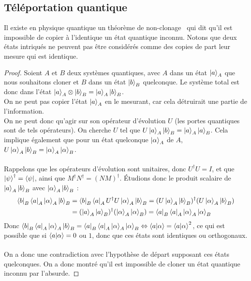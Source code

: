 \subsection{Téléportation quantique}\label{subsec:quantum-teleportation}

Il existe en physique quantique un théorème de non-clonage~\cite{wiki:non-cloning} qui dit qu'il est
impossible de copier à l'identique un état quantique inconnu.
Notons que deux états intriqués ne peuvent pas être considérés comme des copies
de part leur mesure qui est identique.
\begin{proof}
    Soient $A$ et $B$ deux systèmes quantiques, avec $A$ dans un état
    $\ket{a}_A$ que nous souhaitons cloner et $B$ dans un état $\ket{b}_B$
    quelconque.
    Le système total est donc dans l'état $\ket{a}_A \otimes \ket{b}_B =
    \ket{a}_A \ket{b}_B$.\\
    On ne peut pas copier l'état $\ket{a}_A$ en le mesurant, car cela détruirait
    une partie de l'information.\\
    On ne peut donc qu'agir sur son opérateur d'évolution $U$ (les portes quantiques
    sont de tels opérateurs).
    On cherche $U$ tel que $U\ket{a}_A \ket{b}_B = \ket{a}_A \ket{a}_B$.
    Cela implique également que pour un état quelconque $\ket{\alpha}_A$ de $A$,
    $U\ket{\alpha}_A \ket{b}_B = \ket{\alpha}_A \ket{\alpha}_B$.\\ \\
    Rappelons que les opérateurs d'évolution sont unitaires, donc $U^\dagger U =
    I$, et que $\ket{\psi}^\dagger = \bra{\psi}$, ainsi que $M^\dagger N^\dagger
    = (NM)^\dagger$.
    Étudions donc le produit scalaire de $\ket{a}_A \ket{b}_B$ avec $\ket{\alpha}_A
    \ket{b}_B$ :
    \[
        \begin{split}
            \bra{b}_B \bra{a}_A \ket{\alpha}_A \ket{b}_B &=
            \bra{b}_B \bra{a}_A U^\dagger U \ket{\alpha}_A \ket{b}_B
            = (U \ket{a}_A \ket{b}_B)^\dagger (U \ket{\alpha}_A \ket{b}_B) \\
            &= (\ket{a}_A \ket{a}_B)^\dagger (\ket{\alpha}_A \ket{\alpha}_B)
            = \bra{a}_B \bra{a}_A \ket{\alpha}_A \ket{\alpha}_B
        \end{split}
    \]
    Donc $\bra{b}_B \bra{a}_A \ket{\alpha}_A \ket{b}_B = \bra{a}_B \bra{a}_A \ket{\alpha}_A
    \ket{\alpha}_B \Leftrightarrow \braket{a}{\alpha} = \braket{a}{\alpha}^2$, ce qui
    est possible que si $\braket{a}{\alpha} = 0$ ou $1$, donc que ces états sont
    identiques ou orthogonaux.\\ \\
    On a donc une contradiction avec l'hypothèse de départ supposant ces états
    quelconques.
    On a donc montré qu'il est impossible de cloner un état quantique inconnu par
    l'absurde.
\end{proof}
